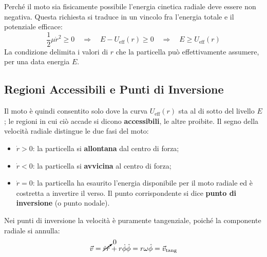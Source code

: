 Perché il moto sia fisicamente possibile l'energia cinetica radiale deve essere non negativa. Questa richiesta si traduce in un vincolo fra l'energia totale e il potenziale efficace:
\begin{equation}
    \frac{1}{2} \mu \dot{r}^2 \geq 0
    \quad \Longrightarrow \quad E - U_{\text{eff}}(r) \geq 0
    \quad \Longrightarrow \quad E \geq U_{\text{eff}}(r)
\end{equation}
La condizione delimita i valori di $r$ che la particella può effettivamente assumere, per una data energia $E$.

\subsection{Regioni Accessibili e Punti di Inversione}

Il moto è quindi consentito solo dove la curva $U_{\text{eff}}(r)$ sta al di sotto del livello $E$; le regioni in cui ciò accade si dicono \textbf{accessibili}, le altre proibite. Il segno della velocità radiale distingue le due fasi del moto:
\begin{itemize}
    \item $\dot{r} > 0$: la particella si \textbf{allontana} dal centro di forza;
    \item $\dot{r} < 0$: la particella si \textbf{avvicina} al centro di forza;
    \item $\dot{r} = 0$: la particella ha esaurito l'energia disponibile per il moto radiale ed è costretta a invertire il verso. Il punto corrispondente si dice \textbf{punto di inversione} (o punto nodale).
\end{itemize}

Nei punti di inversione la velocità è puramente tangenziale, poiché la componente radiale si annulla:
\begin{equation}
    \vec{v} = \cancelto{0}{\dot{r}\hat{r}} + r\dot{\phi}\hat{\phi} = r\omega\hat{\phi} = \vec{v}_{\text{tang}}
\end{equation}

